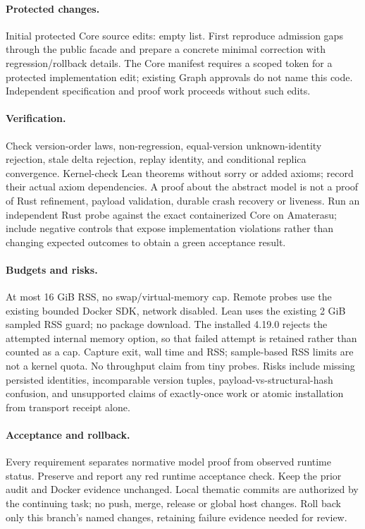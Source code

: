 \documentclass[11pt,a4paper]{article}
\begin{document}
\paragraph{Protected changes.}
Initial protected Core source edits: empty list. First reproduce admission
gaps through the public facade and prepare a concrete minimal correction with
regression/rollback details. The Core manifest requires a scoped token for a
protected implementation edit; existing Graph approvals do not name this code.
Independent specification and proof work proceeds without such edits.
\paragraph{Verification.}
Check version-order laws, non-regression, equal-version unknown-identity
rejection, stale delta rejection, replay identity, and conditional replica
convergence. Kernel-check Lean theorems without sorry or added axioms; record
their actual axiom dependencies. A proof about the abstract model is not a
proof of Rust refinement, payload validation, durable crash recovery or liveness.
Run an independent Rust probe against the exact containerized Core on Amaterasu;
include negative controls that expose implementation violations rather than
changing expected outcomes to obtain a green acceptance result.
\paragraph{Budgets and risks.}
At most 16 GiB RSS, no swap/virtual-memory cap. Remote probes use the existing
bounded Docker SDK, network disabled. Lean uses the existing 2 GiB sampled RSS
guard; no package download. The installed 4.19.0 rejects the attempted internal
memory option, so that failed attempt is retained rather than counted as a cap.
Capture exit, wall
time and RSS; sample-based RSS limits are not a kernel quota. No throughput
claim from tiny probes. Risks include missing persisted identities, incomparable
version tuples, payload-vs-structural-hash confusion, and unsupported claims of
exactly-once work or atomic installation from transport receipt alone.
\paragraph{Acceptance and rollback.}
Every requirement separates normative model proof from observed runtime status.
Preserve and report any red runtime acceptance check. Keep the prior audit and
Docker evidence unchanged. Local thematic commits are authorized by the
continuing task; no push, merge, release or global host changes. Roll back only
this branch's named changes, retaining failure evidence needed for review.
\clearpage
\end{document}
